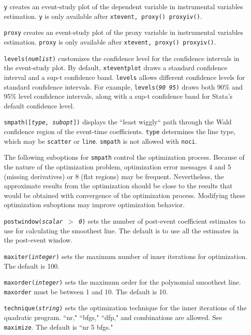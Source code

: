 \documentclass[12pt]{article}
\begin{document}
\hangpara
\texttt{y} creates an event-study plot of the dependent variable in instrumental variables estimation.
\texttt{y} is only available after \texttt{xtevent, proxy() proxyiv()}.

\hangpara
\texttt{proxy} creates an event-study plot of the proxy variable in instrumental variables estimation.
\texttt{proxy} is only available after \texttt{xtevent, proxy() proxyiv()}.

\hangpara
\texttt{levels({\it numlist})} customizes the confidence level for the confidence intervals in the event-study plot.
By default, \texttt{xteventplot} draws a standard confidence interval and a sup-t confidence band.
\texttt{levels} allows different confidence levels for standard confidence intervals.
For example, \texttt{levels({\it 90 95})} draws both 90\% and 95\% level confidence intervals, along with a sup-t confidence band for Stata's default confidence level.

\hangpara
\texttt{smpath([{\it type, subopt}])} displays the ``least wiggly`` path through the Wald confidence region of the event-time coefficients.
\texttt{type} determines the line type, which may be \texttt{scatter} or \texttt{line}.
\texttt{smpath} is not allowed with \texttt{noci}.

\hangpara
The following suboptions for \texttt{smpath} control the optimization process. Because of the nature of the optimization problem, optimization error messages 4 and 5 (missing derivatives) or 8 (flat regions) may be frequent. Nevertheless, the approximate results from the optimization should be close to the results that would be obtained with convergence of the optimization process. Modifying these optimization suboptions may improve optimization behavior.

\morehangpara
\texttt{postwindow({\it scalar $>$ 0})} sets the number of post-event coefficient estimates to use for calculating the smoothest line.
The default is to use all the estimates in the post-event window.

\morehangpara
\texttt{maxiter({\it integer})} sets the maximum number of inner iterations for optimization.
The default is 100.

\morehangpara
\texttt{maxorder({\it integer})} sets the maximum order for the polynomial smoothest line.
\texttt{maxorder} must be between 1 and 10. The default is 10.

\morehangpara
\texttt{technique({\it string})} sets the optimization technique for the inner iterations of the quadratic program. ``nr," ``bfgs," ``dfp," and combinations are allowed. See {\tt maximize}. The default is ``nr 5 bfgs."
\end{document}
